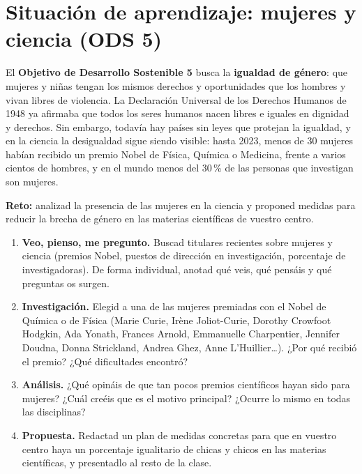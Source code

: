 \section{Situación de aprendizaje: mujeres y ciencia (ODS 5)}\label{sec:ud1-ods}

El \textbf{Objetivo de Desarrollo Sostenible 5} busca la \textbf{igualdad de género}: que mujeres y niñas tengan los mismos
derechos y oportunidades que los hombres y vivan libres de violencia. La Declaración Universal de los Derechos Humanos de 1948
ya afirmaba que todos los seres humanos nacen libres e iguales en dignidad y derechos. Sin embargo, todavía hay países sin
leyes que protejan la igualdad, y en la ciencia la desigualdad sigue siendo visible: hasta 2023, menos de 30 mujeres habían
recibido un premio Nobel de Física, Química o Medicina, frente a varios cientos de hombres, y en el mundo menos del 30\,\% de
las personas que investigan son mujeres.

\begin{marker}
    \textbf{Reto:} analizad la presencia de las mujeres en la ciencia y proponed medidas para reducir la brecha de género en
    las materias científicas de vuestro centro.
\end{marker}

\begin{enumerate}[label=\numberballred]
    \item \textbf{Veo, pienso, me pregunto.} Buscad titulares recientes sobre mujeres y ciencia (premios Nobel, puestos de
    dirección en investigación, porcentaje de investigadoras). De forma individual, anotad qué veis, qué pensáis y qué preguntas
    os surgen.
    \item \textbf{Investigación.} Elegid a una de las mujeres premiadas con el Nobel de Química o de Física (Marie Curie,
    Irène Joliot-Curie, Dorothy Crowfoot Hodgkin, Ada Yonath, Frances Arnold, Emmanuelle Charpentier, Jennifer Doudna,
    Donna Strickland, Andrea Ghez, Anne L'Huillier…). ¿Por qué recibió el premio? ¿Qué dificultades encontró?
    \item \textbf{Análisis.} ¿Qué opináis de que tan pocos premios científicos hayan sido para mujeres? ¿Cuál creéis que es
    el motivo principal? ¿Ocurre lo mismo en todas las disciplinas?
    \item \textbf{Propuesta.} Redactad un plan de medidas concretas para que en vuestro centro haya un porcentaje igualitario de
    chicas y chicos en las materias científicas, y presentadlo al resto de la clase.
\end{enumerate}

